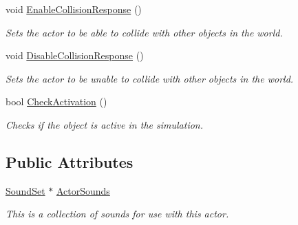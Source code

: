 \begin{DoxyCompactItemize}
void \hyperlink{classphys_1_1ActorBase_a843f60f15435071c08d3cf2480f0ffeb}{EnableCollisionResponse} ()
\begin{DoxyCompactList}\small\item\em Sets the actor to be able to collide with other objects in the world. \item\end{DoxyCompactList}\item 
void \hyperlink{classphys_1_1ActorBase_a23b32c9a9959a9d3b0f883d9b0eac460}{DisableCollisionResponse} ()
\begin{DoxyCompactList}\small\item\em Sets the actor to be unable to collide with other objects in the world. \item\end{DoxyCompactList}\item 
bool \hyperlink{classphys_1_1ActorBase_aacf6737ed91267cb4aa54d4c33eb1ad0}{CheckActivation} ()
\begin{DoxyCompactList}\small\item\em Checks if the object is active in the simulation. \item\end{DoxyCompactList}\end{DoxyCompactItemize}
\subsection*{Public Attributes}
\begin{DoxyCompactItemize}
\item 
\hypertarget{classphys_1_1ActorBase_a2d56e2b3470bfc7dfc6d9ce8c4158d81}{
\hyperlink{namespacephys_ab780c3162da5699fe421f3739ba03fc4}{SoundSet} $\ast$ \hyperlink{classphys_1_1ActorBase_a2d56e2b3470bfc7dfc6d9ce8c4158d81}{ActorSounds}}
\label{d8/d0f/classphys_1_1ActorBase_a2d56e2b3470bfc7dfc6d9ce8c4158d81}

\begin{DoxyCompactList}\small\item\em This is a collection of sounds for use with this actor. \item\end{DoxyCompactList}\end{DoxyCompactItemize}
